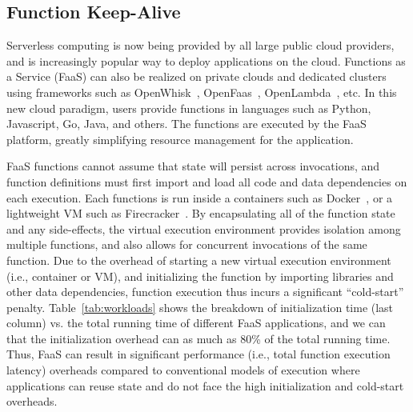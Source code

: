 

\subsection{Function Keep-Alive}
\vspace*{\subsecspace}

Serverless computing is now being provided by all large public cloud providers, and 
is increasingly popular way to deploy applications on the cloud.  
Functions as a Service (FaaS) can also be realized on private clouds and dedicated clusters using frameworks such as OpenWhisk~\cite{openwhisk}, OpenFaas~\cite{openfaas},  OpenLambda~\cite{hendrickson2016serverless}, etc. 
In this new cloud paradigm, users provide functions in languages such as Python, Javascript, Go, Java, and others. 
The functions are executed by the FaaS platform, greatly simplifying resource management for the application. 





%
%
FaaS functions cannot assume that state will persist across invocations, and function definitions must first import and load all code and data dependencies on each execution. 
Each functions is run inside a containers such as Docker~\cite{docker-main}, or a lightweight VM such as Firecracker~\cite{firecracker-nsdi20}. 
By encapsulating all of the function state and any side-effects, the virtual execution environment provides isolation among multiple functions, and also allows for concurrent invocations of the same function. 
Due to the overhead of starting a new virtual execution environment (i.e., container or VM), and initializing the function by importing libraries and other data dependencies, function execution thus incurs a significant ``cold-start'' penalty.
Table~\ref{tab:workloads} shows the breakdown of initialization time (last column) vs. the total running time of different FaaS applications, and we can that the initialization overhead can as much as 80\% of the total running time. 
Thus, FaaS can result in significant performance (i.e., total function execution latency) overheads compared to conventional models of execution where applications can reuse state and do not face the high initialization and cold-start overheads. 




